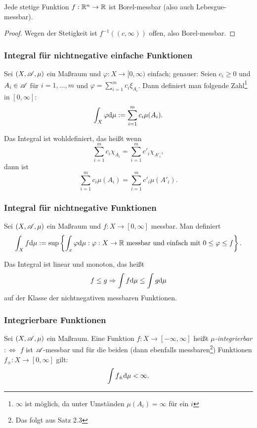 \documentclass[
 a4paper,
 12pt,
 parskip=half
 ]{scrartcl}
\theoremstyle{plain}
\theoremstyle{definition}
\numberwithin{equation}{section}
\begin{document}
\begin{bem}
 Jede stetige Funktion $f:\mathbb{R}^n \to \mathbb{R}$ ist Borel-messbar (also auch Lebesgue-messbar).
\end{bem}

\begin{proof}
 Wegen der Stetigkeit ist $f^{-1}((c,\infty))$ offen, also Borel-messbar.
\end{proof}

\subsubsection{Integral für nichtnegative einfache Funktionen}
Sei $(X,\mathscr{A},\mu)$ ein Maßraum und $\varphi: X \to [0, \infty)$ einfach; genauer: Seien $c_i \ge 0$ und $A_i \in \mathscr{A}$ für $i=1,\ldots,m$ und $\varphi = \sum_{i=1}^m c_i \xi_{A_i}$. Dann definiert man folgende Zahl\footnote{{$\infty$ ist möglich, da unter Umständen $\mu(A_i) = \infty$ für ein $i$}} in $[0,\infty]$:
\[ \int_X \varphi \mathrm{d} \mu := \sum_{i=1}^m c_i \mu( A_i ). \]

\begin{bem}
 Das Integral ist wohldefiniert, das heißt wenn
 \[ \sum_{i=1}^m c_i \chi_{A_i} = \sum_{i=1}^m c'_i \chi_{A'_i}, \]
 dann ist 
 \[ \sum_{i=1}^m c_i \mu(A_i) = \sum_{i=1}^m c'_i \mu(A'_i). \]
\end{bem}

\subsubsection{Integral für nichtnegative Funktionen}
Sei $(X,\mathscr{A},\mu)$ ein Maßraum und $f: X \to [0, \infty]$ messbar. Man definiert
\[ \int_X f \mathrm{d} \mu := \sup \left\{ \int_x \varphi \mathrm{d} \mu : \varphi: X \to \mathbb{R} \text{ messbar und einfach mit } 0 \le \varphi \le f \right\}. \]

\begin{bem}
 Das Integral ist linear und monoton, das heißt
 \[ f \le g \Rightarrow \int f \mathrm{d} \mu \le \int g \mathrm{d} \mu \]
 auf der Klasse der nichtnegativen messbaren Funktionen.
\end{bem}

\subsubsection{Integrierbare Funktionen}
Sei $(X,\mathscr{A},\mu)$ ein Maßraum. Eine Funktion $f:X \to [-\infty,\infty]$ heißt \emph{$\mu$-integrierbar} $:\Leftrightarrow$ $f$ ist $\mathscr{A}$-messbar und für die beiden (dann ebenfalls messbaren\footnote{Das folgt aus Satz 2.3}) Funktionen $f_\pm : X \to [0,\infty]$ gilt:
\[ \int f_\pm \mathrm{d} \mu < \infty. \]
\end{document}
